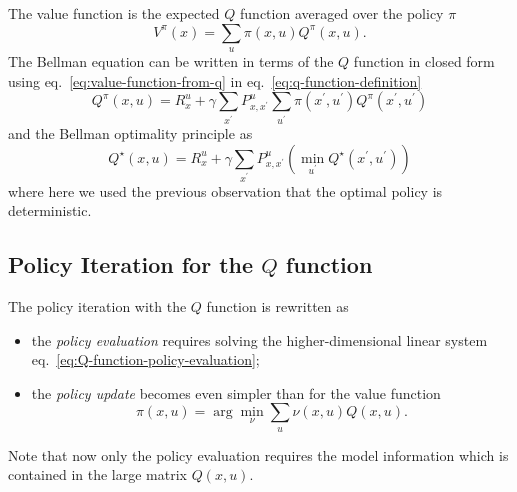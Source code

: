 The value function is the expected $Q$ function averaged over the policy $\pi$
\begin{equation}
  \label{eq:value-function-from-q}
  V^\pi(x) = \sum_u \pi(x,u)Q^\pi(x,u).
\end{equation}
The Bellman equation can be written in terms of the $Q$ function in closed form using eq.~\eqref{eq:value-function-from-q} in eq.~\eqref{eq:q-function-definition}
\begin{equation}
  \label{eq:Q-function-policy-evaluation}
  Q^\pi(x,u) = R_x^u + \gamma \sum_{x^\prime} P_{x,x^\prime}^u \sum_{u^\prime} \pi(x^\prime,u^\prime)Q^\pi(x^\prime,u^\prime)
\end{equation}
and the Bellman optimality principle as
\begin{equation}
  \label{eq:Q-function-Bellman-optimality}
  Q^\star(x,u) = R_x^u + \gamma \sum_{x^\prime}P_{x,x^\prime}^u \left(\min_{u^\prime} Q^\star(x^\prime,u^\prime)\right)
\end{equation}
where here we used the previous observation that the optimal policy is deterministic.

\subsection{Policy Iteration for the $Q$ function}

The policy iteration with the $Q$ function is rewritten as
\begin{itemize}
\item the \emph{policy evaluation} requires solving the higher-dimensional linear system eq.~\eqref{eq:Q-function-policy-evaluation};
\item the \emph{policy update} becomes even simpler than for the value function
  \begin{equation*}
    \pi(x,u) = \arg \min_\nu \sum_u \nu(x,u) Q(x,u).
  \end{equation*}
\end{itemize}
Note that now only the policy evaluation requires the model information which is contained in the large matrix $Q(x,u)$.

